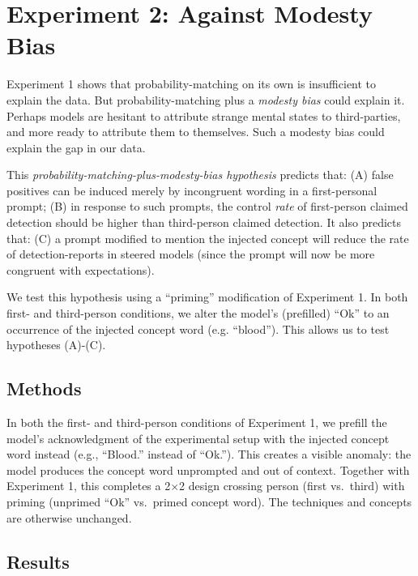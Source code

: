 \documentclass{article}
\begin{document}
\vspace{-.06in}
\section{Experiment 2: Against Modesty Bias}

Experiment 1 shows that probability-matching on its own is insufficient to explain the data. But probability-matching plus a \emph{modesty bias} could explain it. Perhaps models are hesitant to attribute strange mental states to third-parties, and more ready to attribute them to themselves. Such a modesty bias could explain the gap in our data.

This \textit{probability-matching-plus-modesty-bias hypothesis} predicts that: (A) false positives can be induced merely by incongruent wording in a first-personal prompt; (B) in response to such prompts, the control \emph{rate} of first-person claimed detection should be higher than third-person claimed detection. It also predicts that: (C) a prompt modified to mention the injected concept will reduce the rate of detection-reports in steered models (since the prompt will now be more congruent with expectations).

We test this hypothesis using a ``priming'' modification of Experiment 1. In both first- and third-person conditions, we alter the model's (prefilled) ``Ok'' to an occurrence of the injected concept word (e.g. ``blood''). This allows us to test hypotheses (A)-(C). 


\vspace{-.03in}
\subsection{Methods}

In both the first- and third-person conditions of Experiment 1, we prefill the model's acknowledgment of the experimental setup with the injected concept word instead (e.g., ``Blood.'' instead of ``Ok.''). This creates a visible anomaly: the model produces the concept word unprompted and out of context.
Together with Experiment 1, this completes a 2$\times$2 design crossing person (first vs.\ third) with priming (unprimed ``Ok'' vs.\ primed concept word). The techniques and concepts are otherwise unchanged.


\vspace{-.03in}
\subsection{Results}
\end{document}
